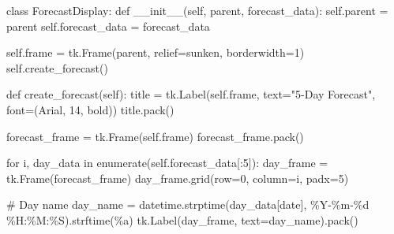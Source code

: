 \documentclass[
  letterpaper,
  DIV=11,
  numbers=noendperiod,
  oneside]{scrreprt}
\newenvironment{Shaded}{}{}
\newcommand{\BuiltInTok}[1]{\textcolor[rgb]{0.84,0.23,0.29}{#1}}
\newcommand{\CommentTok}[1]{\textcolor[rgb]{0.42,0.45,0.49}{#1}}
\newcommand{\ControlFlowTok}[1]{\textcolor[rgb]{0.84,0.23,0.29}{#1}}
\newcommand{\DecValTok}[1]{\textcolor[rgb]{0.00,0.36,0.77}{#1}}
\newcommand{\FunctionTok}[1]{\textcolor[rgb]{0.44,0.26,0.76}{#1}}
\newcommand{\KeywordTok}[1]{\textcolor[rgb]{0.84,0.23,0.29}{#1}}
\newcommand{\NormalTok}[1]{\textcolor[rgb]{0.14,0.16,0.18}{#1}}
\newcommand{\OperatorTok}[1]{\textcolor[rgb]{0.14,0.16,0.18}{#1}}
\newcommand{\SpecialCharTok}[1]{\textcolor[rgb]{0.00,0.36,0.77}{#1}}
\newcommand{\StringTok}[1]{\textcolor[rgb]{0.01,0.18,0.38}{#1}}
\newcommand{\VariableTok}[1]{\textcolor[rgb]{0.89,0.38,0.04}{#1}}
\begin{document}
\begin{Shaded}
\begin{Highlighting}[]
\KeywordTok{class}\NormalTok{ ForecastDisplay:}
    \KeywordTok{def} \FunctionTok{\_\_init\_\_}\NormalTok{(}\VariableTok{self}\NormalTok{, parent, forecast\_data):}
        \VariableTok{self}\NormalTok{.parent }\OperatorTok{=}\NormalTok{ parent}
        \VariableTok{self}\NormalTok{.forecast\_data }\OperatorTok{=}\NormalTok{ forecast\_data}
        
        \VariableTok{self}\NormalTok{.frame }\OperatorTok{=}\NormalTok{ tk.Frame(parent, relief}\OperatorTok{=}\StringTok{\textquotesingle{}sunken\textquotesingle{}}\NormalTok{, borderwidth}\OperatorTok{=}\DecValTok{1}\NormalTok{)}
        \VariableTok{self}\NormalTok{.create\_forecast()}
    
    \KeywordTok{def}\NormalTok{ create\_forecast(}\VariableTok{self}\NormalTok{):}
\NormalTok{        title }\OperatorTok{=}\NormalTok{ tk.Label(}\VariableTok{self}\NormalTok{.frame, text}\OperatorTok{=}\StringTok{"5{-}Day Forecast"}\NormalTok{, }
\NormalTok{                        font}\OperatorTok{=}\NormalTok{(}\StringTok{\textquotesingle{}Arial\textquotesingle{}}\NormalTok{, }\DecValTok{14}\NormalTok{, }\StringTok{\textquotesingle{}bold\textquotesingle{}}\NormalTok{))}
\NormalTok{        title.pack()}
        
\NormalTok{        forecast\_frame }\OperatorTok{=}\NormalTok{ tk.Frame(}\VariableTok{self}\NormalTok{.frame)}
\NormalTok{        forecast\_frame.pack()}
        
        \ControlFlowTok{for}\NormalTok{ i, day\_data }\KeywordTok{in} \BuiltInTok{enumerate}\NormalTok{(}\VariableTok{self}\NormalTok{.forecast\_data[:}\DecValTok{5}\NormalTok{]):}
\NormalTok{            day\_frame }\OperatorTok{=}\NormalTok{ tk.Frame(forecast\_frame)}
\NormalTok{            day\_frame.grid(row}\OperatorTok{=}\DecValTok{0}\NormalTok{, column}\OperatorTok{=}\NormalTok{i, padx}\OperatorTok{=}\DecValTok{5}\NormalTok{)}
            
            \CommentTok{\# Day name}
\NormalTok{            day\_name }\OperatorTok{=}\NormalTok{ datetime.strptime(day\_data[}\StringTok{\textquotesingle{}date\textquotesingle{}}\NormalTok{], }\StringTok{\textquotesingle{}\%Y{-}\%m{-}}\SpecialCharTok{\%d}\StringTok{ \%H:\%M:\%S\textquotesingle{}}\NormalTok{).strftime(}\StringTok{\textquotesingle{}\%a\textquotesingle{}}\NormalTok{)}
\NormalTok{            tk.Label(day\_frame, text}\OperatorTok{=}\NormalTok{day\_name).pack()}
            

\end{Highlighting}
\end{Shaded}
\end{document}

